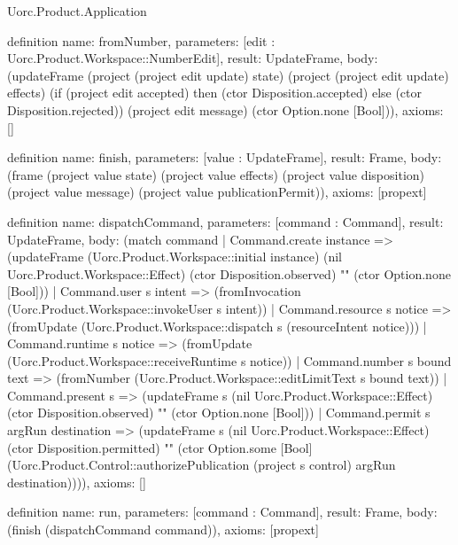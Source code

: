\begin{lexlean}{Uorc.Product.Application}
\begin{semanticmodule}
definition{
  name: fromNumber,
  parameters: [edit : Uorc.Product.Workspace::NumberEdit],
  result: UpdateFrame,
  body: (updateFrame (project (project edit update) state) (project (project edit update) effects) (if (project edit accepted) then (ctor Disposition.accepted) else (ctor Disposition.rejected)) (project edit message) (ctor Option.none [Bool])),
  axioms: []
}

definition{
  name: finish,
  parameters: [value : UpdateFrame],
  result: Frame,
  body: (frame (project value state) (project value effects) (project value disposition) (project value message) (project value publicationPermit)),
  axioms: [propext]
}

definition{
  name: dispatchCommand,
  parameters: [command : Command],
  result: UpdateFrame,
  body: (match command
    | Command.create instance => (updateFrame (Uorc.Product.Workspace::initial instance) (nil Uorc.Product.Workspace::Effect) (ctor Disposition.observed) "" (ctor Option.none [Bool]))
    | Command.user s intent => (fromInvocation (Uorc.Product.Workspace::invokeUser s intent))
    | Command.resource s notice => (fromUpdate (Uorc.Product.Workspace::dispatch s (resourceIntent notice)))
    | Command.runtime s notice => (fromUpdate (Uorc.Product.Workspace::receiveRuntime s notice))
    | Command.number s bound text => (fromNumber (Uorc.Product.Workspace::editLimitText s bound text))
    | Command.present s => (updateFrame s (nil Uorc.Product.Workspace::Effect) (ctor Disposition.observed) "" (ctor Option.none [Bool]))
    | Command.permit s argRun destination => (updateFrame s (nil Uorc.Product.Workspace::Effect) (ctor Disposition.permitted) "" (ctor Option.some [Bool] (Uorc.Product.Control::authorizePublication (project s control) argRun destination)))),
  axioms: []
}

definition{
  name: run,
  parameters: [command : Command],
  result: Frame,
  body: (finish (dispatchCommand command)),
  axioms: [propext]
}
\end{semanticmodule}
\end{lexlean}
